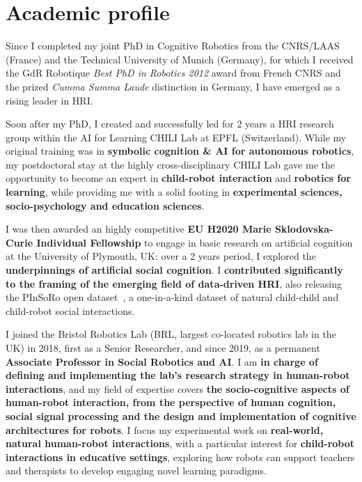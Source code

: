 
\section{Academic profile}\label{early-achievements-track-record}


Since I completed my joint PhD in Cognitive Robotics from the CNRS/LAAS (France) and the
Technical University of Munich (Germany), for which I received the GdR Robotique \emph{Best
PhD in Robotics 2012} award from French CNRS and the prized \emph{Cumma Summa
Laude} distinction in Germany, I have emerged as a rising leader in
HRI.

Soon after my PhD, I created and successfully led for 2 years a HRI research
group within the AI for Learning CHILI Lab at EPFL (Switzerland). While my
original training was in \textbf{symbolic cognition \& AI for autonomous
robotics}, my postdoctoral stay at the highly cross-disciplinary CHILI Lab gave
me the opportunity to become an expert in \textbf{child-robot interaction} and
\textbf{robotics for learning}, while providing me with a solid footing in
\textbf{experimental sciences, socio-psychology and education sciences}.

I was then awarded an highly competitive \textbf{EU H2020 Marie Sklodovska-Curie Individual
Fellowship} to engage in basic research on artificial cognition at the
University of Plymouth, UK: over a 2 years period, I explored the \textbf{underpinnings
of artificial social cognition}. I \textbf{contributed significantly to the
framing of the emerging field of data-driven HRI}, also releasing the PInSoRo
open dataset~\cite{pinsoro2018}, a
one-in-a-kind dataset of natural child-child and child-robot social
interactions.

I joined the Bristol Robotics Lab (BRL, largest co-located robotics lab in the UK)
in 2018, first as a Senior Researcher, and since 2019, as a permanent
\textbf{Associate Professor in Social Robotics and AI}. I am \textbf{in charge
of defining and implementing the lab's research strategy in human-robot
interactions}, and my field of expertise covers \textbf{the socio-cognitive
aspects of human-robot interaction, from the perspective of human cognition,
social signal processing and the design and implementation of cognitive
architectures for robots}. I focus my
experimental work on \textbf{real-world, natural human-robot interactions}, with
a particular interest for \textbf{child-robot interactions in educative
settings}, exploring how robots can support teachers and therapists to develop
engaging novel learning paradigms.


